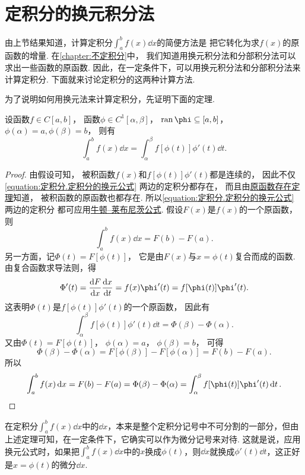 \section{定积分的换元积分法}
由上节结果知道，计算定积分\(\int_a^b f(x) \dd{x}\)的简便方法是
把它转化为求\(f(x)\)的原函数的增量.
在\cref{chapter:不定积分}中，
我们知道用换元积分法和分部积分法可以求出一些函数的原函数.
因此，在一定条件下，可以用换元积分法和分部积分法来计算定积分.
下面就来讨论定积分的这两种计算方法.

为了说明如何用换元法来计算定积分，先证明下面的定理.
\begin{theorem}\label{theorem:定积分.定积分的换元法}
设函数\(f \in C[a,b]\)，
函数\(\phi \in C^1[\alpha,\beta]\)，
\(\ran\phi \subseteq [a,b]\)，
\(\phi(\alpha)=a,
\phi(\beta)=b\)，
则有\begin{equation}\label{equation:定积分.定积分的换元公式}
	\int_a^b f(x) \dd{x} = \int_\alpha^\beta f[\phi(t)] \phi'(t) \dd{t}.
\end{equation}
\begin{proof}
由假设可知，
被积函数\(f(x)\)和\(f[\phi(t)] \phi'(t)\)都是连续的，
因此不仅\cref{equation:定积分.定积分的换元公式} 两边的定积分都存在，
而且由\hyperref[theorem:定积分.原函数存在定理]{原函数存在定理}知道，
被积函数的原函数也都存在.
所以\cref{equation:定积分.定积分的换元公式} 两边的定积分
都可应用\hyperref[equation:定积分.牛顿--莱布尼茨公式]{牛顿--莱布尼茨公式}.
假设\(F(x)\)是\(f(x)\)的一个原函数，则\[
	\int_a^b f(x) \dd{x} = F(b) - F(a).
\]
另一方面，记\(\Phi(t) = F[\phi(t)]\)，
它是由\(F(x)\)与\(x=\phi(t)\)复合而成的函数.
由复合函数求导法则，得\[
	\Phi'(t) = \dv{F}{x} \dv{x}{t}
	= f(x) \phi'(t)
	= f[\phi(t)] \phi'(t).
\]
这表明\(\Phi(t)\)是\(f[\phi(t)] \phi'(t)\)的一个原函数，
因此有\[
	\int_\alpha^\beta f[\phi(t)] \phi'(t) \dd{t}
	= \Phi(\beta) - \Phi(\alpha).
\]
又由\(\Phi(t) = F[\phi(t)]\)，
\(\phi(\alpha) = a\)，
\(\phi(\beta) = b\)，
可得\[
	\Phi(\beta) - \Phi(\alpha)
	= F[\phi(\beta)] - F[\phi(\alpha)]
	= F(b) - F(a).
\]
所以\[
	\int_a^b f(x) \dd{x}
	= F(b) - F(a)
	= \Phi(\beta) - \Phi(\alpha)
	= \int_\alpha^\beta f[\phi(t)] \phi'(t) \dd{t}.
	\qedhere
\]
\end{proof}
\end{theorem}
在定积分\(\int_a^b f(x) \dd{x}\)中的\(\dd{x}\)，本来是整个定积分记号中不可分割的一部分，但由上述定理可知，在一定条件下，它确实可以作为微分记号来对待.
这就是说，应用换元公式时，如果把\(\int_a^b f(x) \dd{x}\)中的\(x\)换成\(\phi(t)\)，则\(\dd{x}\)就换成\(\phi'(t) \dd{t}\)，这正好是\(x = \phi(t)\)的微分\(\dd{x}\).

